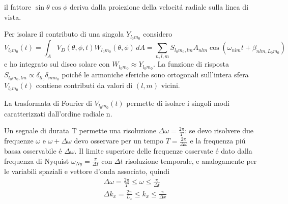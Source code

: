 \documentclass[../main.tex]{subfiles}
\begin{document}
il fattore $\sin{\theta}\cos{\phi}$ deriva dalla proiezione della velocit\'a radiale sulla linea di vista.

Per isolare il contributo di una singola $Y_{l_0m_0}$ considero
\begin{equation}
V_{l_0m_0}(t)=\int_AV_D(\theta,\phi,t)W_{l_0m_0}(\theta,\phi)\,dA=\sum_{n,l,m}S_{l_0m_0,lm}A_{nlm}\cos{(\omega_{nlm}t+\beta_{nlm,L_0m_0})}
\end{equation}
e ho integrato sul disco solare con $W_{l_0m_0}\approx Y_{l_0m_0}$. La funzione di risposta $S_{l_0m_0,lm}\propto\delta_{ll_0}\delta_{mm_0}$ poich\'e le armoniche sferiche sono ortogonali sull'intera sfera $V_{l_0m_0}(t)$ contiene contributi da valori di $(l,m)$ vicini.

La trasformata di Fourier di $V_{l_0m_0}(t)$ permette di isolare i singoli modi caratterizzati dall'ordine radiale n.

Un segnale di durata T permette una risoluzione $\Delta\omega=\frac{2\pi}{T}$: se devo risolvere due frequenze $\omega$ e $\omega+\Delta\omega$ devo osservare per un tempo $T=\frac{2\pi}{\Delta\omega}$ e la frequenza pi\'u bassa osservabile \'e $\Delta\omega$. Il limite superiore delle frequenze osservate \'e dato dalla frequenza di Nyquist $\omega_{Ny}=\frac{\pi}{\Delta t}$ con $\Delta t$ risoluzione temporale, e analogamente per le variabili spaziali e vettore d'onda associato, quindi
\begin{align}
&\Delta\omega=\frac{2\pi}{T}\leq\omega\leq\frac{\pi}{\Delta t}\\
&\Delta k_x=\frac{2\pi}{L_x}\leq k_x\leq\frac{\pi}{\Delta x}
\end{align}
\end{document}
